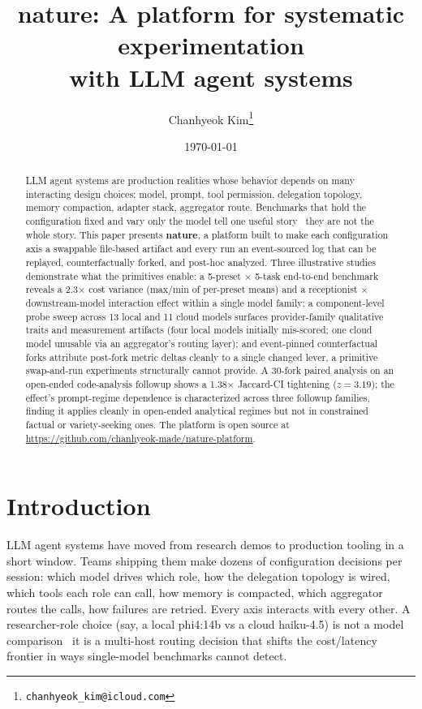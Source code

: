 \documentclass[11pt,a4paper]{article}
\title{\textbf{nature}: A platform for systematic experimentation\\
       with LLM agent systems}
\author{Chanhyeok Kim\thanks{\texttt{chanhyeok\_kim@icloud.com}}}
\date{\today}
\begin{document}
\maketitle

\begin{abstract}
LLM agent systems are production realities whose behavior depends on
many interacting design choices: model, prompt, tool permission,
delegation topology, memory compaction, adapter stack, aggregator
route. Benchmarks that hold the configuration fixed and vary only
the model tell one useful story \textemdash\ they are not the whole
story. This paper presents \textbf{nature}, a platform built to make each
configuration axis a swappable file-based artifact and every run
an event-sourced log that can be replayed, counterfactually forked,
and post-hoc analyzed. Three illustrative studies demonstrate what
the primitives enable: a 5-preset $\times$ 5-task end-to-end
benchmark reveals a 2.3$\times$ cost variance (max/min of per-preset means) and a receptionist
$\times$ downstream-model interaction effect within a single model
family; a component-level probe sweep across 13 local and 11 cloud
models surfaces provider-family qualitative traits and measurement
artifacts (four local models initially mis-scored; one cloud model
unusable via an aggregator's routing layer); and event-pinned
counterfactual forks attribute post-fork metric deltas cleanly to
a single changed lever, a primitive swap-and-run experiments
structurally cannot provide. A 30-fork paired analysis on an
open-ended code-analysis followup shows a 1.38$\times$ Jaccard-CI
tightening ($z=3.19$); the effect's prompt-regime dependence
is characterized across three followup families,
finding it applies cleanly in open-ended analytical regimes
but not in constrained factual or variety-seeking ones. The
platform is open source at
\url{https://github.com/chanhyeok-made/nature-platform}.
\end{abstract}

\section{Introduction}

LLM agent systems have moved from research demos to production
tooling in a short window. Teams shipping them make dozens of
configuration decisions per session: which model drives which role,
how the delegation topology is wired, which tools each role can
call, how memory is compacted, which aggregator routes the calls,
how failures are retried. Every axis interacts with every other.
A researcher-role choice (say, a local phi4:14b vs a cloud
haiku-4.5) is not a model comparison \textemdash\ it is a
multi-host routing decision that shifts the cost/latency frontier
in ways single-model benchmarks cannot detect.
\end{document}
